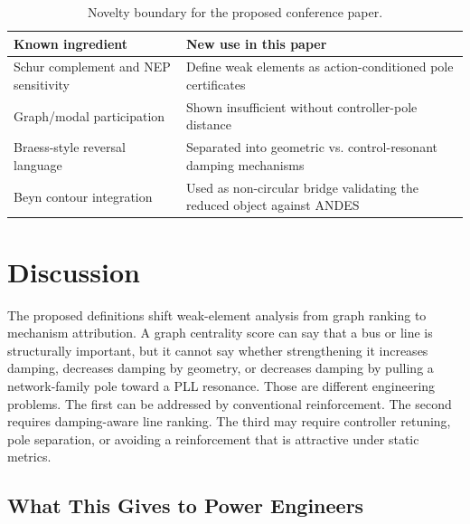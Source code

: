 \documentclass[conference]{IEEEtran}
\begin{document}
\begin{table}[t]
\caption{Novelty boundary for the proposed conference paper.}
\label{tab:novelty}
\centering
\scriptsize
\setlength{\tabcolsep}{2pt}
\begin{tabular}{p{}p{}}
\toprule
Known ingredient & New use in this paper\\
\midrule
Schur complement and NEP sensitivity & Define weak elements as action-conditioned pole certificates\\
Graph/modal participation & Shown insufficient without controller-pole distance\\
Braess-style reversal language & Separated into geometric vs. control-resonant damping mechanisms\\
Beyn contour integration & Used as non-circular bridge validating the reduced object against ANDES\\
\bottomrule
\end{tabular}
\end{table}

\section{Discussion}

The proposed definitions shift weak-element analysis from graph ranking to mechanism attribution. A graph centrality score can say that a bus or line is structurally important, but it cannot say whether strengthening it increases damping, decreases damping by geometry, or decreases damping by pulling a network-family pole toward a PLL resonance. Those are different engineering problems. The first can be addressed by conventional reinforcement. The second requires damping-aware line ranking. The third may require controller retuning, pole separation, or avoiding a reinforcement that is attractive under static metrics.

\subsection{What This Gives to Power Engineers}
\end{document}
